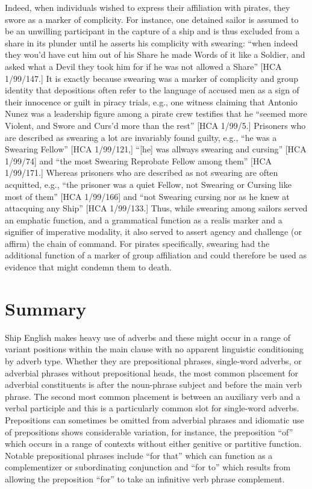 Indeed, when individuals wished to express their affiliation with pirates, they swore as a marker of complicity. For instance, one detained sailor is assumed to be an unwilling participant in the capture of a ship and is thus excluded from a share in its plunder until he asserts his complicity with swearing: “when indeed they wou’d have cut him out of his Share he made Words of it like a Soldier, and asked what a Devil they took him for if he was not allowed a Share” [HCA 1/99/147.] It is exactly because swearing was a marker of complicity and group identity that depositions often refer to the language of accused men as a sign of their innocence or guilt in piracy trials, e.g., one witness claiming that Antonio Nunez was a leadership figure among a pirate crew testifies that he “seemed more Violent, and Swore and Curs’d more than the rest” [HCA 1/99/5.] Prisoners who are described as swearing a lot are invariably found guilty, e.g., “he was a Swearing Fellow” [HCA 1/99/121,] “[he] was allways swearing and cursing” [HCA 1/99/74] and “the most Swearing Reprobate Fellow among them” [HCA 1/99/171.] Whereas prisoners who are described as not swearing are often acquitted, e.g., “the prisoner was a quiet Fellow, not Swearing or Cursing like most of them” [HCA 1/99/166] and “not Swearing cursing nor as he knew at attacquing any Ship” [HCA 1/99/133.] Thus, while swearing among sailors served an emphatic function, and a grammatical function as a realis marker and a signifier of imperative modality, it also served to assert agency and challenge (or affirm) the chain of command.  For pirates specifically, swearing had the additional function of a marker of group affiliation and could therefore be used as evidence that might condemn them to death. 

\section{{Summary}}%

  Ship English makes heavy use of adverbs and these might occur in a range of variant positions within the main clause with no apparent linguistic conditioning by adverb type. Whether they are prepositional phrases, single-word adverbs, or adverbial phrases without prepositional heads, the most common placement for adverbial constituents is after the noun-phrase subject and before the main verb phrase. The second most common placement is between an auxiliary verb and a verbal participle and this is a particularly common slot for single-word adverbs. Prepositions can sometimes be omitted from adverbial phrases and idiomatic use of prepositions shows considerable variation, for instance, the preposition “of” which occurs in a range of contexts without either genitive or partitive function. Notable prepositional phrases include “for that” which can function as a complementizer or subordinating conjunction and “for to” which results from allowing the preposition “for” to take an infinitive verb phrase complement. 

